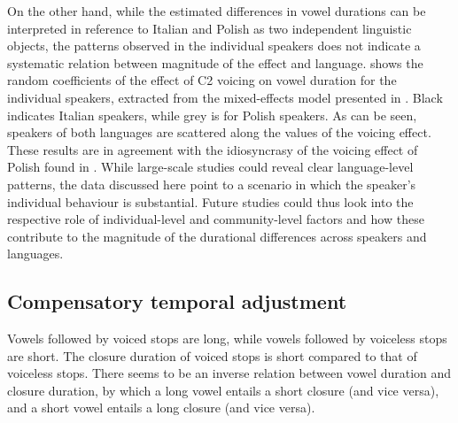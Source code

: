 \documentclass[charis]{glossa}
\begin{document}
On the other hand, while the estimated differences in vowel durations
can be interpreted in reference to Italian and Polish as two independent
linguistic objects, the patterns observed in the individual speakers
does not indicate a systematic relation between magnitude of the effect
and language.  shows the random coefficients of the
effect of C2 voicing on vowel duration for the individual speakers,
extracted from the mixed-effects model presented in .
Black indicates Italian speakers, while grey is for Polish speakers. As
can be seen, speakers of both languages are scattered along the values
of the voicing effect. These results are in agreement with the
idiosyncrasy of the voicing effect of Polish found in
\citet{malisz2008}. While large-scale studies could reveal clear
language-level patterns, the data discussed here point to a scenario in
which the speaker's individual behaviour is substantial. Future studies
could thus look into the respective role of individual-level and
community-level factors and how these contribute to the magnitude of the
durational differences across speakers and languages.

\hypertarget{compensatory-temporal-adjustment}{%
\subsection{Compensatory temporal
adjustment}\label{compensatory-temporal-adjustment}}

\label{s:comp}

Vowels followed by voiced stops are long, while vowels followed by
voiceless stops are short. The closure duration of voiced stops is short
compared to that of voiceless stops. There seems to be an inverse
relation between vowel duration and closure duration, by which a long
vowel entails a short closure (and vice versa), and a short vowel
entails a long closure (and vice versa).
\end{document}
